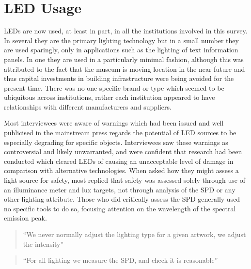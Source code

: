 \section{LED Usage}
\Glspl{LED} are now used, at least in part, in all the institutions involved in this survey. In several they are the primary lighting technology but in a small number they are used sparingly, only in applications such as the lighting of text information panels. In one they are used in a particularly minimal fashion, although this was attributed to the fact that the museum is moving location in the near future and thus capital investments in building infrastructure were being avoided for the present time. There was no one specific brand or type which seemed to be ubiquitous across institutions, rather each institution appeared to have relationships with different manufacturers and suppliers.

Most interviewees were aware of warnings which had been issued and well publicised in the mainstream press \citep{lewis_smith_will_2013} regards the potential of \gls{LED} sources to be especially degrading for specific objects. Interviewees saw these warnings as controversial and likely unwarranted, and were confident that research had been conducted which cleared \Glspl{LED} of causing an unacceptable level of damage in comparison with alternative technologies. When asked how they might assess a light source for safety, most replied that safety was assessed solely through use of an illuminance meter and lux targets, not through analysis of the \gls{SPD} or any other lighting attribute. Those who did critically assess the \gls{SPD} generally used no specific tools to do so, focusing attention on the wavelength of the spectral emission peak.

\begin{quote}
``We never normally adjust the lighting type for a given artwork, we adjust the intensity''
\end{quote}

\begin{quote}
``For all lighting we measure the \gls{SPD}, and check it is reasonable''
\end{quote}


